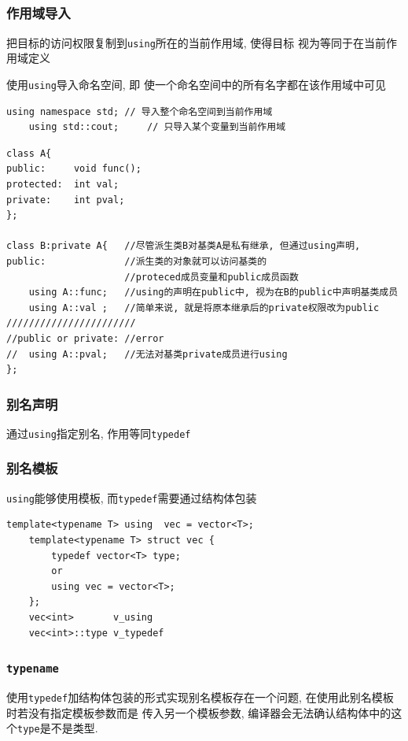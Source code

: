\subsection{\color{purple}{\tt using}}
\subsubsection{作用域导入}
把目标的访问权限复制到{\tt using}所在的当前作用域, 
	使得目标 视为等同于在当前作用域定义

使用{\tt using}导入命名空间, 即 使一个命名空间中的所有名字都在该作用域中可见
\begin{lstlisting}[xleftmargin=5em,xrightmargin=5em]
	using namespace std; // 导入整个命名空间到当前作用域
	using std::cout;     // 只导入某个变量到当前作用域 
\end{lstlisting}


\begin{lstlisting}[title=在派生类中引用基类成员]
class A{
public:		void func();
protected:	int val;
private:	int pval;
};

class B:private A{   //尽管派生类B对基类A是私有继承, 但通过using声明,
public:			     //派生类的对象就可以访问基类的
					 //proteced成员变量和public成员函数
	using A::func;   //using的声明在public中, 视为在B的public中声明基类成员
	using A::val ;   //简单来说, 就是将原本继承后的private权限改为public
///////////////////////	
//public or private: //error	
//	using A::pval;   //无法对基类private成员进行using
};
\end{lstlisting}
\subsubsection{别名声明}
通过{\tt using}指定别名, 作用等同{\tt typedef}
\subsubsection{别名模板}
{\tt using}能够使用模板, 而{\tt typedef}需要通过结构体包装
\begin{lstlisting}[xleftmargin=2em,xrightmargin=2em]
	template<typename T> using  vec = vector<T>;
	template<typename T> struct vec {
		typedef vector<T> type;
		or
		using vec = vector<T>;
	};
	vec<int>       v_using
	vec<int>::type v_typedef
\end{lstlisting}
\subsubsection{\tt{typename}}
使用{\tt typedef}加结构体包装的形式实现别名模板存在一个问题, 在使用此别名模板时若没有指定模板参数而是
	传入另一个模板参数, 编译器会无法确认结构体中的这个{\tt type}是不是类型.

